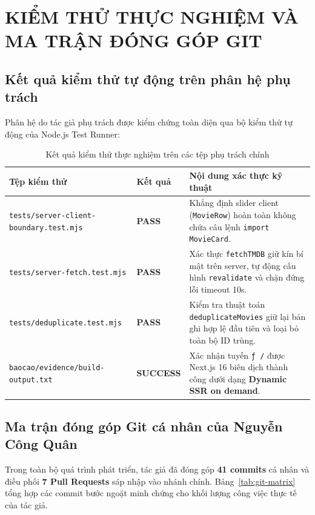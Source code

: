\documentclass[12pt,a4paper]{extarticle}
\begin{document}
\section{KIỂM THỬ THỰC NGHIỆM VÀ MA TRẬN ĐÓNG GÓP GIT}

\subsection{Kết quả kiểm thử tự động trên phân hệ phụ trách}
Phân hệ do tác giả phụ trách được kiểm chứng toàn diện qua bộ kiểm thử tự động của Node.js Test Runner:

\begin{table}[H]
\centering
\caption{Kết quả kiểm thử thực nghiệm trên các tệp phụ trách chính}
\label{tab:test-results}
\fontsize{9.5}{12.5}\selectfont
\renewcommand{\arraystretch}{1.2}
\begin{tabularx}{\textwidth}{|p{5.5cm}|p{2.0cm}|X|}
\hline
\textbf{Tệp kiểm thử} & \textbf{Kết quả} & \textbf{Nội dung xác thực kỹ thuật} \\
\hline
\nolinkurl{tests/server-client-boundary.test.mjs} & \textbf{PASS} & Khẳng định slider client (\texttt{MovieRow}) hoàn toàn không chứa câu lệnh \texttt{import MovieCard}. \\
\hline
\nolinkurl{tests/server-fetch.test.mjs} & \textbf{PASS} & Xác thực \texttt{fetchTMDB} giữ kín bí mật trên server, tự động cấu hình \texttt{revalidate} và chặn đứng lỗi timeout 10s. \\
\hline
\nolinkurl{tests/deduplicate.test.mjs} & \textbf{PASS} & Kiểm tra thuật toán \texttt{deduplicateMovies} giữ lại bản ghi hợp lệ đầu tiên và loại bỏ toàn bộ ID trùng. \\
\hline
\nolinkurl{baocao/evidence/build-output.txt} & \textbf{SUCCESS} & Xác nhận tuyến \texttt{ƒ /} được Next.js 16 biên dịch thành công dưới dạng \textbf{Dynamic SSR on demand}. \\
\hline
\end{tabularx}
\end{table}

\subsection{Ma trận đóng góp Git cá nhân của Nguyễn Công Quân}
Trong toàn bộ quá trình phát triển, tác giả đã đóng góp \textbf{41 commits} cá nhân và điều phối \textbf{7 Pull Requests} sáp nhập vào nhánh chính. Bảng~\ref{tab:git-matrix} tổng hợp các commit bước ngoặt minh chứng cho khối lượng công việc thực tế của tác giả.
\end{document}
